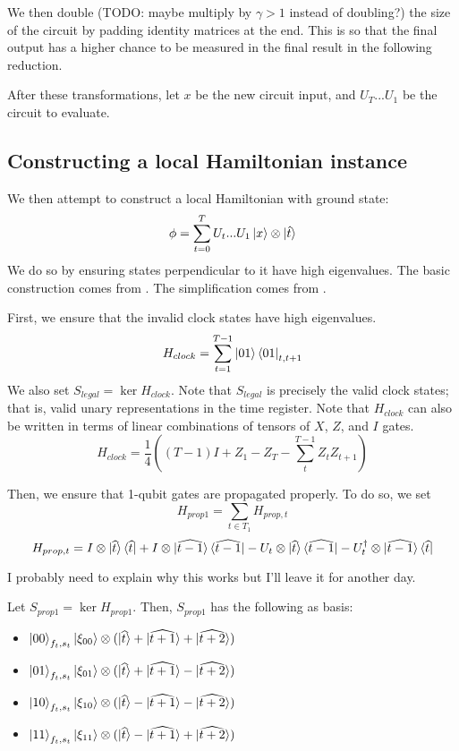 \documentclass{article}
\theoremstyle{definition}
\begin{document}
We then double (TODO: maybe multiply by $\gamma>1$ instead of doubling?) the size of the circuit by padding identity matrices at the end. This is so that the final output has a higher chance to be measured in the final result in the following reduction.

After these transformations, let $x$ be the new circuit input, and $U_T...U_1$ be the circuit to evaluate.

\subsection{Constructing a local Hamiltonian instance}

We then attempt to construct a local Hamiltonian with ground state: $$\phi=\sum_{t=0}^TU_t...U_1\ket{x}\otimes\ket{\hat{t}}$$
We do so by ensuring states perpendicular to it have high eigenvalues. The basic construction comes from \cite{kitaev2002classical}. The simplification comes from \cite{biamonte_love_2008}.

First, we ensure that the invalid clock states have high eigenvalues.
$$H_{clock}=\sum_{t=1}^{T-1}\ket{01}\bra{01}_{t,t+1}$$
We also set $S_{legal}=\ker H_{clock}$. Note that $S_{legal}$ is precisely the valid clock states; that is, valid unary representations in the time register. Note that $H_{clock}$ can also be written in terms of linear combinations of tensors of $X$, $Z$, and $I$ gates.
$$H_{clock}=\frac{1}{4}((T-1)I + Z_1 - Z_T - \sum_t^{T-1}Z_tZ_{t+1})$$

Then, we ensure that 1-qubit gates are propagated properly. To do so, we set
	$$H_{prop1}=\sum_{t\in T_1}H_{prop,t}$$
	$$H_{prop,t}=I\otimes\ket{\widehat{t}}\bra{\widehat{t}}
		+I\otimes\ket{\widehat{t-1}}\bra{\widehat{t-1}}
		-U_t\otimes\ket{\widehat{t}}\bra{\widehat{t-1}}
		-U_t^\dagger\otimes\ket{\widehat{t-1}}\bra{\widehat{t}}$$

I probably need to explain why this works but I'll leave it for another day.

Let $S_{prop1}=\ker H_{prop1}$.
Then, $S_{prop1}$ has the following as basis:
\begin{itemize}
	\item $\ket{00}_{f_t,s_t}\ket{\xi_{00}}\otimes
		(\ket{\widehat{t}}+\ket{\widehat{t+1}}+\ket{\widehat{t+2}})$
	\item $\ket{01}_{f_t,s_t}\ket{\xi_{01}}\otimes
		(\ket{\widehat{t}}+\ket{\widehat{t+1}}-\ket{\widehat{t+2}})$
	\item $\ket{10}_{f_t,s_t}\ket{\xi_{10}}\otimes
		(\ket{\widehat{t}}-\ket{\widehat{t+1}}-\ket{\widehat{t+2}})$
	\item $\ket{11}_{f_t,s_t}\ket{\xi_{11}}\otimes
		(\ket{\widehat{t}}-\ket{\widehat{t+1}}+\ket{\widehat{t+2}})$
\end{itemize}
\end{document}
